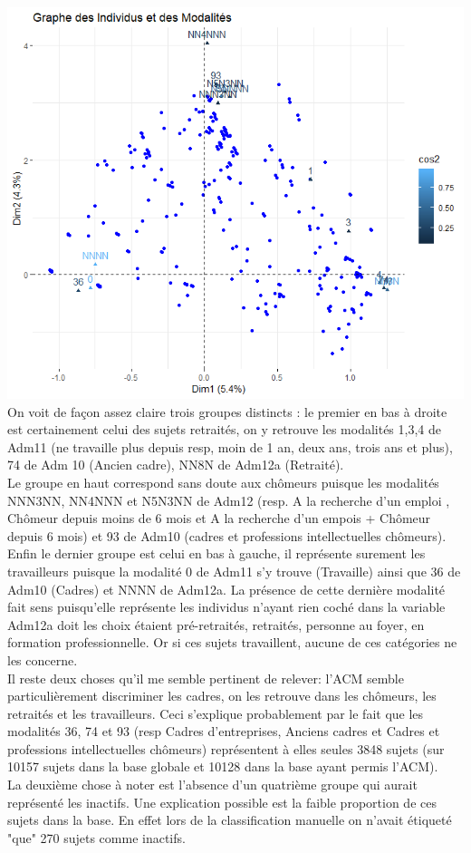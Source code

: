 \documentclass{book}
\begin{document}
\includegraphics[scale = .8]{ACM_var_ind.png}\\

\noindent
On voit de façon assez claire trois groupes distincts : le premier en bas à droite est certainement celui des sujets retraités, on y retrouve les modalités 1,3,4 de Adm11 (ne travaille plus depuis resp, moin de 1 an, deux ans, trois ans et plus), 74 de Adm 10 (Ancien cadre), NN8N de Adm12a (Retraité).\\
\noindent
Le groupe en haut correspond sans doute aux chômeurs puisque les modalités NNN3NN, NN4NNN et N5N3NN de Adm12 (resp. A la recherche d'un emploi , Chômeur depuis moins de 6 mois et A la recherche d'un empois + Chômeur depuis 6 mois) et 93 de Adm10 (cadres et professions intellectuelles chômeurs).\\
Enfin le dernier groupe est celui en bas à gauche, il représente surement les travailleurs puisque la modalité 0 de Adm11 s'y trouve (Travaille) ainsi que 36 de Adm10 (Cadres) et NNNN de Adm12a. La présence de cette dernière modalité fait sens puisqu'elle représente les individus n'ayant rien coché dans la variable Adm12a doit les choix étaient pré-retraités, retraités, personne au foyer, en formation professionnelle. Or si ces sujets travaillent, aucune de ces catégories ne les concerne.\\

\noindent
Il reste deux choses qu'il me semble pertinent de relever: l'ACM semble particulièrement discriminer les cadres, on les retrouve dans les chômeurs, les retraités et les travailleurs. Ceci s'explique probablement par le fait que les modalités 36, 74 et 93 (resp Cadres d'entreprises, Anciens cadres et Cadres et professions intellectuelles chômeurs) représentent à elles seules 3848 sujets (sur 10157 sujets dans la base globale et 10128 dans la base ayant permis l'ACM).\\
La deuxième chose à noter est l'absence d'un quatrième groupe qui aurait représenté les inactifs. Une explication possible est la faible proportion de ces sujets dans la base. En effet lors de la classification manuelle on n'avait étiqueté "que" 270 sujets comme inactifs. \\
\end{document}
